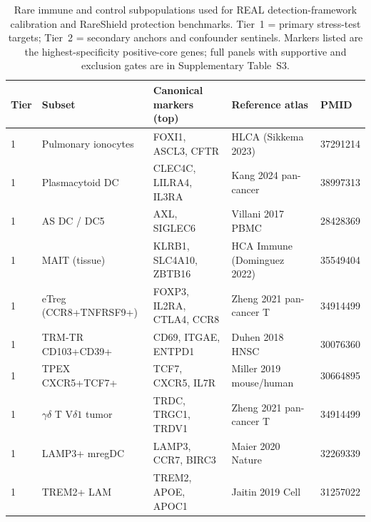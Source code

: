 
\begin{table}[h]
\centering
\footnotesize
\caption{Rare immune and control subpopulations used for REAL detection-framework
calibration and RareShield protection benchmarks. Tier~1 = primary stress-test
targets; Tier~2 = secondary anchors and confounder sentinels. Markers listed are
the highest-specificity positive-core genes; full panels with supportive and
exclusion gates are in Supplementary Table~S3.}
\label{tab:S2-rare-populations}
\begin{tabular}{@{}l l p{32mm} p{32mm} l@{}}
\toprule
Tier & Subset & Canonical markers (top) & Reference atlas & PMID \\
\midrule
1 & Pulmonary ionocytes               & FOXI1, ASCL3, CFTR         & HLCA (Sikkema 2023)           & 37291214 \\
1 & Plasmacytoid DC                   & CLEC4C, LILRA4, IL3RA      & Kang 2024 pan-cancer          & 38997313 \\
1 & AS DC / DC5                       & AXL, SIGLEC6               & Villani 2017 PBMC             & 28428369 \\
1 & MAIT (tissue)                     & KLRB1, SLC4A10, ZBTB16     & HCA Immune (Dominguez 2022)   & 35549404 \\
1 & eTreg (CCR8+TNFRSF9+)             & FOXP3, IL2RA, CTLA4, CCR8  & Zheng 2021 pan-cancer T       & 34914499 \\
1 & TRM-TR CD103+CD39+                & CD69, ITGAE, ENTPD1        & Duhen 2018 HNSC               & 30076360 \\
1 & TPEX CXCR5+TCF7+                  & TCF7, CXCR5, IL7R          & Miller 2019 mouse/human       & 30664895 \\
1 & $\gamma\delta$ T V$\delta1$ tumor & TRDC, TRGC1, TRDV1         & Zheng 2021 pan-cancer T       & 34914499 \\
1 & LAMP3+ mregDC                     & LAMP3, CCR7, BIRC3         & Maier 2020 Nature             & 32269339 \\
1 & TREM2+ LAM                        & TREM2, APOE, APOC1         & Jaitin 2019 Cell              & 31257022 \\

\end{tabular}
\end{table}

